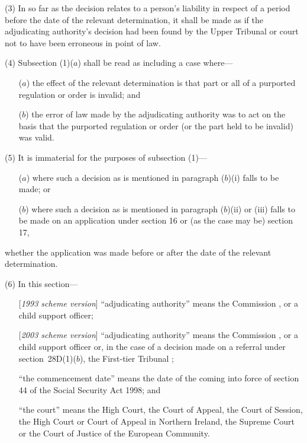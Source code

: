 \documentclass[12pt,a4paper]{article}
\begin{document}
(3) In so far as the decision relates to a person’s liability 
in respect of a period before the date of the relevant determination, it shall be made as if the adjudicating authority’s decision had been found by the 
Upper Tribunal  %
or court not to have been erroneous in point of law.

(4) Subsection (1)($a$) shall be read as including a case where—
\begin{enumerate}\item[]
($a$) the effect of the relevant determination is that part or all of a purported regulation or order is invalid; and

($b$) the error of law made by the adjudicating authority was to act on the basis that the purported regulation or order (or the part held to be invalid) was valid.
\end{enumerate}

(5) It is immaterial for the purposes of subsection (1)—
\begin{enumerate}\item[]
($a$) where such a decision as is mentioned in paragraph ($b$)(i) falls to be made; or

($b$) where such a decision as is mentioned in paragraph ($b$)(ii) or (iii) falls to be made on an application under section 16 or (as the case may be) section 17,
\end{enumerate}
whether the application was made before or after the date of the relevant determination.

(6) In this section—
\begin{enumerate}\item[]
    [\emph{1993 scheme version}] “adjudicating authority” means the 
Commission%
, or a child support officer;

    [\emph{2003 scheme version}] “adjudicating authority” means the 
Commission%
, or a child support officer
or, in the case of a decision made on a referral under section~28D(1)($b$), 
the First-tier Tribunal%
;

    “the commencement date” means the date of the coming into force of section 44 of the Social Security Act 1998; and

    “the court” means the High Court, the Court of Appeal, the Court of Session, the High Court or Court of Appeal in Northern Ireland, the 
Supreme Court  %
or the Court of Justice of the European Community. 
\end{enumerate}
\end{document}
